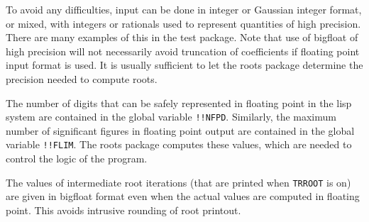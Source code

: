 To avoid any difficulties, input can be done in integer or Gaussian
integer format, or mixed, with integers or rationals used to represent
quantities of high precision. There are many examples of this in the
test package. Note that use of bigfloat of high precision will not
necessarily avoid truncation of coefficients if floating point input
format is used.  It is usually sufficient to let the roots package
determine the precision needed to compute roots.

The number of digits that can be safely represented in floating point in the
lisp system are contained in the global variable {\tt !!NFPD}.  Similarly,
the maximum number of significant figures in floating point output are
contained in the global variable {\tt !!FLIM}.  The roots package computes
these values, which are needed to control the logic of the program.
 

The values of intermediate root iterations (that are printed when
{\tt TRROOT} is on) are given in bigfloat format even when the actual values
are computed in floating point.  This avoids intrusive rounding of root
printout.


